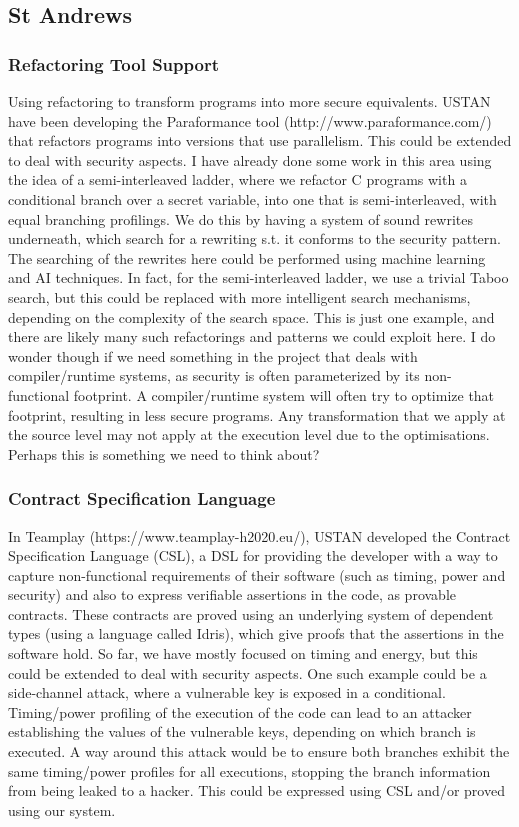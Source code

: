 \documentclass[a4paper,11pt]{article}
\begin{document}
\subsection{St Andrews}

\subsubsection{Refactoring Tool Support}
Using refactoring to transform programs into more secure equivalents. USTAN have been developing the Paraformance tool (http://www.paraformance.com/) that refactors programs into versions that use parallelism. This could be extended to deal with security aspects. I have already done some work in this area using the idea of a semi-interleaved ladder, where we refactor C programs with a conditional branch over a secret variable, into one that is semi-interleaved, with equal branching profilings. We do this by having a system of sound rewrites underneath, which search for a rewriting s.t. it conforms to the security pattern.  The searching of the rewrites here could be performed using machine learning and AI techniques. In fact, for the semi-interleaved ladder, we use a trivial Taboo search, but this could be replaced with more intelligent search mechanisms, depending on the complexity of the search space.  This is just one example, and there are likely many such refactorings and patterns we could exploit here. I do wonder though if we need something in the project that deals with compiler/runtime systems, as security is often parameterized by its non-functional footprint. A compiler/runtime system will often try to optimize that footprint, resulting in less secure programs. Any transformation that we apply at the source level may not apply at the execution level due to the optimisations. Perhaps this is something we need to think about?

\subsubsection{Contract Specification Language}
In Teamplay (https://www.teamplay-h2020.eu/), USTAN developed the Contract Specification Language (CSL), a DSL for providing the developer with a way to capture non-functional requirements of their software (such as timing, power and security) and also to express verifiable assertions in the code, as provable contracts. These contracts are proved using an underlying system of dependent types (using a language called Idris), which give proofs that the assertions in the software hold. So far, we have mostly focused on timing and energy, but this could be extended to deal with security aspects. One such example could be a side-channel attack, where a vulnerable key is exposed in a conditional. Timing/power profiling of the execution of the code can lead to an attacker establishing the values of the vulnerable keys, depending on which branch is executed. A way around this attack would be to ensure both branches exhibit the same timing/power profiles for all executions, stopping the branch information from being leaked to a hacker. This could be expressed using CSL and/or proved using our system.
\end{document}
